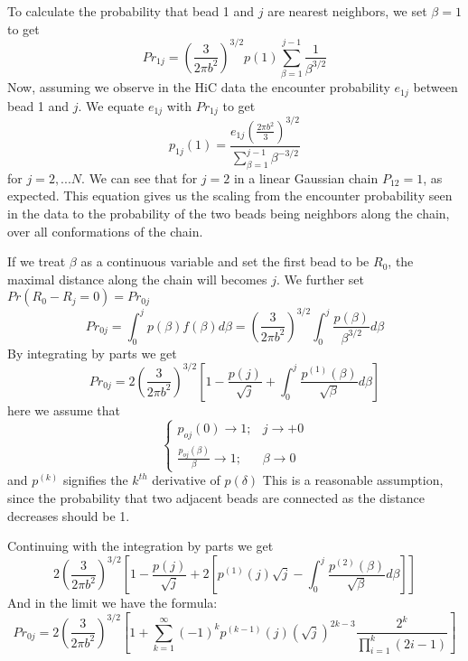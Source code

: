 \documentclass[12pt]{article}
\begin{document}
To calculate the probability that bead 1 and $j$ are nearest neighbors, we set $\beta=1$ to get
\begin{equation*}
Pr_{1j}=\left(\frac{3}{2\pi b^2}\right)^{3/2}p(1)\sum_{\beta=1}^{j-1}\frac{1}{\beta^{3/2}}
\end{equation*}
Now, assuming we observe in the HiC data the encounter probability $e_{1j}$ between bead 1 and $j$. We equate $e_{1j}$ with $Pr_{1j}$ to get 
\begin{equation*}
p_{1j}(1)=\frac{e_{1j}\left(\frac{2\pi b^2}{3}\right)^{3/2}}{\sum_{\beta=1}^{j-1}\beta^{-3/2}}
\end{equation*}
for $j=2,...N$. We can see that for $j=2$ in a linear Gaussian chain $P_{12}=1$, as expected. This equation gives us the scaling from the encounter probability seen in the data to the probability of the two beads being neighbors along the chain, over all conformations of the chain. 

If we treat $\beta$ as a continuous variable and set the first bead to be $R_0$, the maximal distance along the chain will becomes $j$. We further set $Pr(R_0-R_j=0)=Pr_{0j}$ 
\begin{equation*}
Pr_{0j}= \int_{0}^{j} p(\beta)f(\beta)d\beta= \left(\frac{3}{2\pi b^2}\right)^{3/2}\int_0^{j} \frac{p(\beta)}{\beta^{3/2}}d\beta
\end{equation*}
By integrating by parts we get 
\begin{equation}
Pr_{0j}=2\left(\frac{3}{2\pi b^2}\right)^{3/2}\left[1 -\frac{p(j)}{\sqrt{j}}+\int_0^{j}\frac{p^{(1)}(\beta)}{\sqrt{\beta}}d\beta  \right]
\end{equation}
here we assume that 
\begin{equation*}
\begin{cases}
p_{oj}(0)\rightarrow 1; & j\rightarrow +0\\
\frac{p_{oj}(\beta)}{\beta}\rightarrow 1; & \beta \rightarrow 0 
\end{cases}
\end{equation*}
 and $p^{(k)}$ signifies the $k^{th}$ derivative of $p(\delta)$
This is a reasonable assumption, since the probability that two adjacent beads are connected as the distance decreases should be 1. 

Continuing with the integration by parts we get 
\begin{equation*}
2\left(\frac{3}{2\pi b^2}\right)^{3/2}\left[1 -\frac{p(j)}{\sqrt{j}}+2[p^{(1)}(j)\sqrt{j}-\int_0^{j}\frac{p^{(2)}(\beta)}{\sqrt{\beta}}d\beta]\right]
\end{equation*}
And in the limit we have the formula:
\begin{equation*}
Pr_{0j}=2\left(\frac{3}{2\pi b^2}\right)^{3/2}\left[ 1+\sum_{k=1}^\infty (-1)^k p^{(k-1)}(j)\left(\sqrt{j}\right)^{2k-3} \frac{2^k}{\prod_{i=1}^k (2i-1)}\right]
\end{equation*} 
\end{document}
